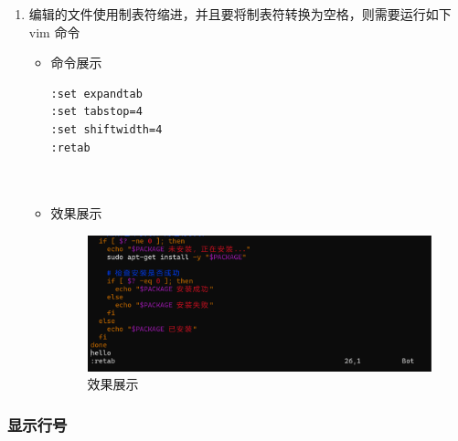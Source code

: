 \documentclass[UTF8]{ctexart}
\begin{document}
\begin{enumerate}
  \item 编辑的文件使用制表符缩进，并且要将制表符转换为空格，则需要运行如下vim 命令
  \begin{itemize}
  \item 命令展示
  \begin{verbatim}
:set expandtab
:set tabstop=4
:set shiftwidth=4
:retab

    
  \end{verbatim}

  \item 效果展示
  \begin{figure}[H]
    \centering
    \includegraphics[width=\textwidth]{26} %
    \caption{效果展示}
  
  \end{figure}
\end{itemize}
\end{enumerate}
\subsubsection{显示行号}
\end{document}
